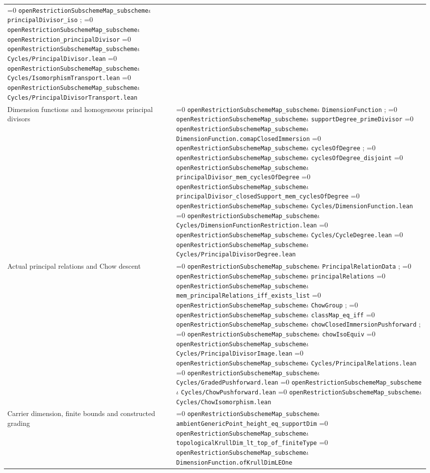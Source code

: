 \documentclass[11pt]{article}
\theoremstyle{definition}
\theoremstyle{remark}
\newcommand{\leanpath}[1]{%
  \ifnum\pdfstrcmp{\detokenize{#1}}%
      {\detokenize{openRestrictionSubschemeMap_subschemeι}}=0
    \texttt{\nolinkurl{openRestrictionSubschemeMap_subscheme}}\ensuremath{\iota}%
  \else
    \texttt{\nolinkurl{#1}}%
  \fi}
\begin{document}
\begin{longtable}{@{}>{\raggedright\arraybackslash}p{}
                >{\raggedright\arraybackslash}p{}@{}}
\leanpath{principalDivisor_iso}; \leanpath{openRestriction_principalDivisor}\newline
\leanpath{Cycles/PrincipalDivisor.lean}\newline
\leanpath{Cycles/IsomorphismTransport.lean}\newline
\leanpath{Cycles/PrincipalDivisorTransport.lean}\\
Dimension functions and homogeneous principal divisors &
\leanpath{DimensionFunction}; \leanpath{supportDegree_primeDivisor}\newline
\leanpath{DimensionFunction.comapClosedImmersion}\newline
\leanpath{cyclesOfDegree}; \leanpath{cyclesOfDegree_disjoint}\newline
\leanpath{principalDivisor_mem_cyclesOfDegree}\newline
\leanpath{principalDivisor_closedSupport_mem_cyclesOfDegree}\newline
\leanpath{Cycles/DimensionFunction.lean}\newline
\leanpath{Cycles/DimensionFunctionRestriction.lean}\newline
\leanpath{Cycles/CycleDegree.lean}\newline
\leanpath{Cycles/PrincipalDivisorDegree.lean}\\
Actual principal relations and Chow descent &
\leanpath{PrincipalRelationData}; \leanpath{principalRelations}\newline
\leanpath{mem_principalRelations_iff_exists_list}\newline
\leanpath{ChowGroup}; \leanpath{classMap_eq_iff}\newline
\leanpath{chowClosedImmersionPushforward}; \leanpath{chowIsoEquiv}\newline
\leanpath{Cycles/PrincipalDivisorImage.lean}\newline
\leanpath{Cycles/PrincipalRelations.lean}\newline
\leanpath{Cycles/GradedPushforward.lean}\newline
\leanpath{Cycles/ChowPushforward.lean}\newline
\leanpath{Cycles/ChowIsomorphism.lean}\\
Carrier dimension, finite bounds and constructed grading &
\leanpath{ambientGenericPoint_height_eq_supportDim}\newline
\leanpath{topologicalKrullDim_lt_top_of_finiteType}\newline
\leanpath{DimensionFunction.ofKrullDimLEOne}\newline

\end{longtable}
\end{document}
